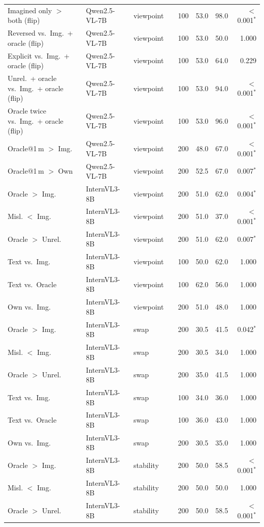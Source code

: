\begin{longtable}{llllrrrr}
Imagined only $>$ both (flip) & Qwen2.5-VL-7B & viewpoint & & 100 & 53.0 & 98.0 & $<$0.001$^*$ \\
Reversed vs.\ Img.\ + oracle (flip) & Qwen2.5-VL-7B & viewpoint & & 100 & 53.0 & 50.0 & 1.000 \\
Explicit vs.\ Img.\ + oracle (flip) & Qwen2.5-VL-7B & viewpoint & & 100 & 53.0 & 64.0 & 0.229 \\
Unrel.\ + oracle vs.\ Img.\ + oracle (flip) & Qwen2.5-VL-7B & viewpoint & & 100 & 53.0 & 94.0 & $<$0.001$^*$ \\
Oracle twice vs.\ Img.\ + oracle (flip) & Qwen2.5-VL-7B & viewpoint & & 100 & 53.0 & 96.0 & $<$0.001$^*$ \\
Oracle@1\,m $>$ Img. & Qwen2.5-VL-7B & viewpoint & & 200 & 48.0 & 67.0 & $<$0.001$^*$ \\
Oracle@1\,m $>$ Own & Qwen2.5-VL-7B & viewpoint & & 200 & 52.5 & 67.0 & 0.007$^*$ \\
Oracle $>$ Img. & InternVL3-8B & viewpoint & & 200 & 51.0 & 62.0 & 0.004$^*$ \\
Misl. $<$ Img. & InternVL3-8B & viewpoint & & 200 & 51.0 & 37.0 & $<$0.001$^*$ \\
Oracle $>$ Unrel. & InternVL3-8B & viewpoint & & 200 & 51.0 & 62.0 & 0.007$^*$ \\
Text vs.\ Img. & InternVL3-8B & viewpoint & & 100 & 50.0 & 62.0 & 1.000 \\
Text vs.\ Oracle & InternVL3-8B & viewpoint & & 100 & 62.0 & 56.0 & 1.000 \\
Own vs.\ Img. & InternVL3-8B & viewpoint & & 200 & 51.0 & 48.0 & 1.000 \\
Oracle $>$ Img. & InternVL3-8B & swap & & 200 & 30.5 & 41.5 & 0.042$^*$ \\
Misl. $<$ Img. & InternVL3-8B & swap & & 200 & 30.5 & 34.0 & 1.000 \\
Oracle $>$ Unrel. & InternVL3-8B & swap & & 200 & 35.0 & 41.5 & 1.000 \\
Text vs.\ Img. & InternVL3-8B & swap & & 100 & 34.0 & 36.0 & 1.000 \\
Text vs.\ Oracle & InternVL3-8B & swap & & 100 & 36.0 & 43.0 & 1.000 \\
Own vs.\ Img. & InternVL3-8B & swap & & 200 & 30.5 & 35.0 & 1.000 \\
Oracle $>$ Img. & InternVL3-8B & stability & & 200 & 50.0 & 58.5 & $<$0.001$^*$ \\
Misl. $<$ Img. & InternVL3-8B & stability & & 200 & 50.0 & 50.0 & 1.000 \\
Oracle $>$ Unrel. & InternVL3-8B & stability & & 200 & 50.0 & 58.5 & $<$0.001$^*$ \\

\end{longtable}
